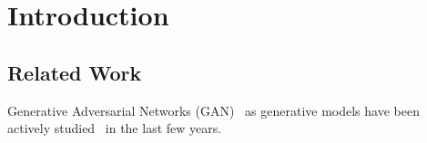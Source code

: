 \section{Introduction} \label{sec:intro}

\subsection{Related Work}

Generative Adversarial Networks (GAN)~\cite{goodfellow2014generative}
as generative models have been actively studied~\cite{chen2016infogan,
arjovsky2017wasserstein,zhao2016energy,radford2015unsupervised,
mescheder2017adversarial,mirza2014conditional,gauthier2014conditional,
odena2016conditional,denton2015deep,reed2016generative,
huang2016stacked,zhang2016stackgan,kim2017learning,zhu2017unpaired,
che2016mode,donahue2016adversarial,salimans2016improved,zhu2016generative}
in the last few years.
